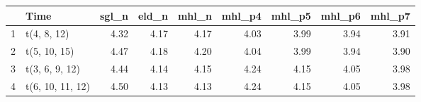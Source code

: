 \begin{table}[ht]
\centering
\begin{tabular}{rlrrrrrrr}
  \hline
 & Time & sgl\_n & eld\_n & mhl\_n & mhl\_p4 & mhl\_p5 & mhl\_p6 & mhl\_p7 \\ 
  \hline
1 & t(4, 8, 12) & 4.32 & 4.17 & 4.17 & 4.03 & 3.99 & 3.94 & 3.91 \\ 
  2 & t(5, 10, 15) & 4.47 & 4.18 & 4.20 & 4.04 & 3.99 & 3.94 & 3.90 \\ 
  3 & t(3, 6, 9, 12) & 4.44 & 4.14 & 4.15 & 4.24 & 4.15 & 4.05 & 3.98 \\ 
  4 & t(6, 10, 11, 12) & 4.50 & 4.13 & 4.13 & 4.24 & 4.15 & 4.05 & 3.98 \\ 
   \hline
\end{tabular}
\end{table}
